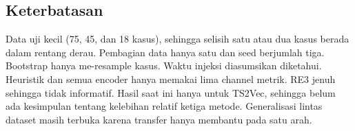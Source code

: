 \subsection{Keterbatasan}
Data uji kecil (75, 45, dan 18 kasus), sehingga selisih satu atau dua kasus berada dalam rentang derau. Pembagian data hanya satu dan seed berjumlah tiga. Bootstrap hanya me-resample kasus. Waktu injeksi diasumsikan diketahui. Heuristik dan semua encoder hanya memakai lima channel metrik. RE3 jenuh sehingga tidak informatif. Hasil saat ini hanya untuk TS2Vec, sehingga belum ada kesimpulan tentang kelebihan relatif ketiga metode. Generalisasi lintas dataset masih terbuka karena transfer hanya membantu pada satu arah.

